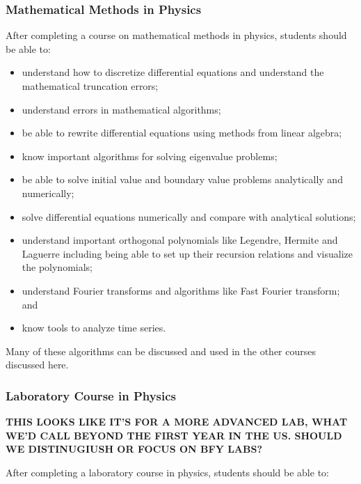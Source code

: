 \documentclass[graybox,envcountchap,sectrefs]{svmult}
\begin{document}
\subsubsection{Mathematical Methods in  Physics}
After completing a course on mathematical methods in physics, students should be able to:
\begin{itemize}
\item understand how to discretize differential equations and understand the mathematical truncation errors;

\item understand errors in mathematical algorithms;

\item be able to rewrite differential equations using methods from linear algebra;

\item know important algorithms for solving eigenvalue problems;

\item be able to solve initial value and boundary value problems analytically and numerically;

\item solve differential equations numerically and compare with analytical solutions;

\item understand important orthogonal polynomials like Legendre, Hermite and Laguerre including being able to set up their recursion relations and visualize the polynomials;

\item understand Fourier transforms and algorithms like Fast Fourier transform; and

\item know tools to analyze time series.
\end{itemize}


Many of these algorithms can be discussed and used in the other courses discussed here.

\subsubsection{Laboratory Course in Physics}
{\bf THIS LOOKS LIKE IT'S FOR A MORE ADVANCED LAB, WHAT WE'D CALL BEYOND THE FIRST YEAR IN THE US. SHOULD WE DISTINUGIUSH OR FOCUS ON BFY LABS?}

After completing a  laboratory course in physics, students should be able to:
\end{document}
